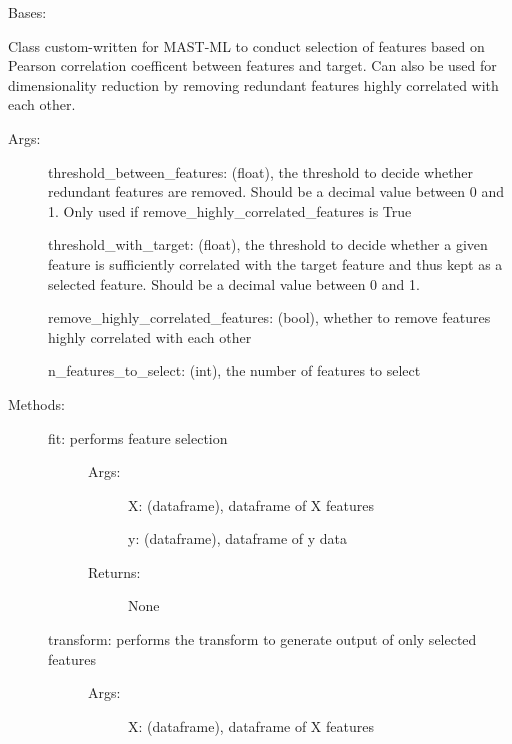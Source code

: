 \documentclass[letterpaper,10pt,english]{sphinxmanual}
\begin{document}
\begin{fulllineitems}
\label{\detokenize{api/mastml.feature_selectors.PearsonSelector:mastml.feature_selectors.PearsonSelector}}
Bases: {\hyperref[\detokenize{api/mastml.feature_selectors.BaseSelector:mastml.feature_selectors.BaseSelector}]{}}

Class custom-written for MAST-ML to conduct selection of features based on Pearson correlation coefficent between
features and target. Can also be used for dimensionality reduction by removing redundant features highly correlated
with each other.
\begin{description}
\item[{Args:}] \leavevmode
threshold\_between\_features: (float), the threshold to decide whether redundant features are removed. Should
be a decimal value between 0 and 1. Only used if remove\_highly\_correlated\_features is True

threshold\_with\_target: (float), the threshold to decide whether a given feature is sufficiently correlated
with the target feature and thus kept as a selected feature. Should be a decimal value between 0 and 1.

remove\_highly\_correlated\_features: (bool), whether to remove features highly correlated with each other

n\_features\_to\_select: (int), the number of features to select

\item[{Methods:}] \leavevmode\begin{description}
\item[{fit: performs feature selection}] \leavevmode\begin{description}
\item[{Args:}] \leavevmode
X: (dataframe), dataframe of X features

y: (dataframe), dataframe of y data

\item[{Returns:}] \leavevmode
None

\end{description}

\item[{transform: performs the transform to generate output of only selected features}] \leavevmode\begin{description}
\item[{Args:}] \leavevmode
X: (dataframe), dataframe of X features


\end{description}
\end{description}
\end{description}
\end{fulllineitems}
\end{document}
